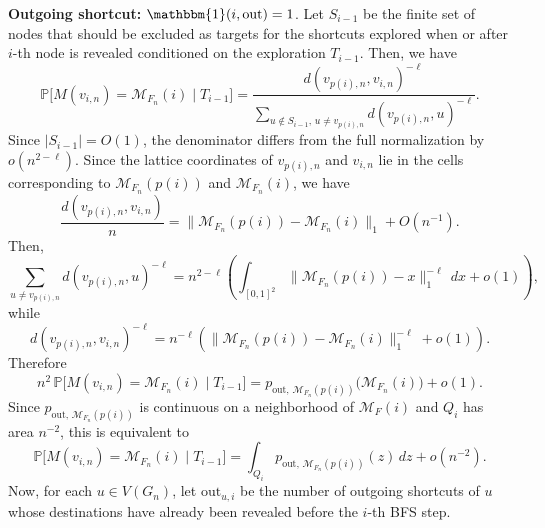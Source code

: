 \documentclass[10pt]{amsart}
\begin{document}
\noindent\textbf{Outgoing shortcut: } $\mathbbm{1}(i,\mathrm{out})=1$.
Let $S_{i-1}$ be the finite set of nodes that should be excluded as targets for the shortcuts explored when or after $i$-th node is revealed conditioned on the exploration $T_{i-1}$. Then, we have
\[
\mathbb P\big[M(v_{i,n})=\mathcal M_{F_n}(i)\mid T_{i-1}\big]
=
\frac{d(v_{p(i),n},v_{i,n})^{-\ell}}
{\sum_{u\notin S_{i-1},\,u\neq v_{p(i),n}} d(v_{p(i),n},u)^{-\ell}}.
\]
Since $|S_{i-1}|=O(1)$, the denominator differs from the full normalization by
$o(n^{2-\ell})$. 
Since the lattice coordinates of \(v_{p(i),n}\) and \(v_{i,n}\) lie in the cells
corresponding to \(\mathcal M_{F_n}(p(i))\) and \(\mathcal M_{F_n}(i)\), we have
\[
\frac{d(v_{p(i),n},v_{i,n})}{n}
=
\|\mathcal M_{F_n}(p(i))-\mathcal M_{F_n}(i)\|_1 + O(n^{-1}).
\]
Then,
\[
\sum_{u\neq v_{p(i),n}} d(v_{p(i),n},u)^{-\ell}
=
n^{2-\ell}
\left(
\int_{[0,1]^2}\|\mathcal M_{F_n}(p(i))-x\|_1^{-\ell}\,dx
+o(1)
\right),
\]
while
\[
d(v_{p(i),n},v_{i,n})^{-\ell}
=
n^{-\ell}
\left(
\|\mathcal M_{F_n}(p(i))-\mathcal M_{F_n}(i)\|_1^{-\ell}
+o(1)
\right).
\]
Therefore
\[
n^2\,\mathbb P\big[M(v_{i,n})=\mathcal M_{F_n}(i)\mid T_{i-1}\big]
=
p_{\mathrm{out},\,\mathcal M_{F_n}(p(i))}\big(\mathcal M_{F_n}(i)\big)+o(1).
\]
Since $p_{\mathrm{out},\,\mathcal M_{F_n}(p(i))}$ is continuous on a neighborhood of \(\mathcal M_{F}(i)\) and $Q_i$ has
area $n^{-2}$, this is equivalent to
\[
\mathbb P\big[M(v_{i,n})=\mathcal M_{F_n}(i)\mid T_{i-1}\big]
=
\int_{Q_i} p_{\mathrm{out},\,\mathcal M_{F_n}(p(i))}(z)\,dz + o(n^{-2}).
\]
Now, for each $u\in V(G_n)$, let \(\mathrm{out}_{u,i}\) be the number of outgoing shortcuts of \(u\) whose destinations have already been revealed before the \(i\)-th BFS step.
\end{document}
